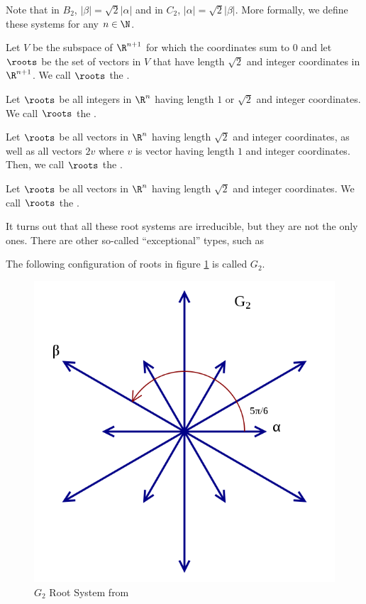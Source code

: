 \documentclass[11pt,leqno,oneside]{amsart}
\numberwithin{thm}{section}
\begin{document}
Note that in \(B_2\), \(|\beta| = \sqrt{2} |\alpha|\) and in \(C_2\),
\(|\alpha| = \sqrt{2}|\beta|\). More formally, we define these systems
for any \(n \in \N\).
\begin{defn}
  Let \(V\) be the subspace of \(\R^{n+1}\) for which the coordinates
  sum to \(0\) and let \(\roots\) be the set of vectors in \(V\) that
  have length \(\sqrt{2}\) and integer coordinates in
  \(\R^{n+1}\). We call \(\roots\) the
  .
\end{defn}
\begin{defn}
  Let \(\roots\) be all integers in \(\R^n\) having length \(1\) or
  \(\sqrt{2}\) and integer coordinates. We call \(\roots\) the
  .
\end{defn}
\begin{defn}
  Let \(\roots\) be all vectors in \(\R^n\) having length
  \(\sqrt{2}\) and integer coordinates, as well as all vectors \(2v\)
  where \(v\) is vector having 
  length \(1\) and integer coordinates. Then, we call \(\roots\)
  the .
\end{defn}
\begin{defn}
  Let \(\roots\) be all vectors in \(\R^n\) having length \(\sqrt{2}\)
  and integer coordinates. We call \(\roots\) the .
\end{defn}
It turns out that all these root systems are irreducible, but they are
not the only ones. There are other so-called ``exceptional'' types,
such as
\begin{defn}
  The following configuration of roots in figure \ref{fig:G_2} is called \(G_2\). \\
  \begin{figure}
  \includegraphics[scale=0.3]{images/Root_system_G2_with_labels}    
    \caption{\(G_2\) Root System from \cite{wiki}}
    \label{fig:G_2}
  \end{figure}
\end{defn}
\end{document}
